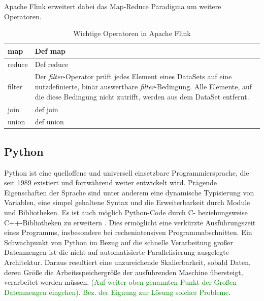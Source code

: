 Apache Flink erweitert dabei das Map-Reduce Paradigma um weitere Operatoren. 

\begin{table}
	\begin{tabular}[c]{| l | p{14cm} |}
		\hline
		map & Def map%
		\\
		\hline
		reduce & Def reduce \\
		\hline
		filter & Der \textit{filter}-Operator prüft jedes Element eines DataSets auf eine nutzdefinierte, binär auswertbare \textit{filter}-Bedingung. Alle Elemente, auf die diese Bedingung nicht zutrifft, werden aus dem DataSet entfernt. \\
		\hline
		join & def join \\
		\hline
		union & def union \\
		\hline
	\end{tabular}
	\caption{Wichtige Operatoren in Apache Flink}
\end{table}


\subsection{Python}
Python ist eine quelloffene und universell einsetzbare Programmiersprache, die seit 1989 existiert und fortwährend weiter entwickelt wird. Prägende Eigenschaften der Sprache sind unter anderem eine dynamische Typisierung von Variablen, eine simpel gehaltene Syntax und die Erweiterbarkeit durch Module und Bibliotheken. Es ist auch möglich Python-Code durch C- beziehungsweise C++-Bibliotheken zu erweitern \cite{Martelli2006}. Dies ermöglicht eine verkürzte Ausführungszeit eines Programms, insbesondere bei rechenintensiven Programmabschnitten. Ein Schwachpunkt von Python im Bezug auf die schnelle Verarbeitung großer Datenmengen ist die nicht auf automatisierte Parallelisierung ausgelegte Architektur. Daraus resultiert eine unzureichende Skalierbarkeit, sobald Daten, deren Größe die Arbeitsspeichergröße der ausführenden Maschine übersteigt, verarbeitet werden müssen. \textcolor{green}{(Auf weiter oben genannten Punkt der Großen Datenmengen eingehen). Bez. der Eignung zur Lösung solcher Probleme}. 


